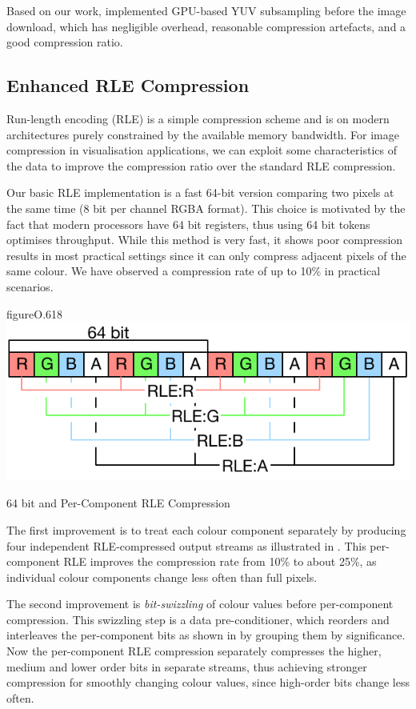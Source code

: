 Based on our work, \cite{MEP:10} implemented GPU-based YUV subsampling before
the image download, which has negligible overhead, reasonable compression
artefacts, and a good compression ratio.

\subsection{Enhanced RLE Compression}

Run-length encoding (RLE) is a simple compression scheme and is on modern
architectures purely constrained by the available memory bandwidth. For image
compression in visualisation applications, we can exploit some characteristics
of the data to improve the compression ratio over the standard RLE compression.

Our basic RLE implementation is a fast 64-bit version comparing two pixels
at the same time (8 bit per channel RGBA format). This choice is motivated by
the fact that modern processors have 64 bit registers, thus using 64 bit tokens
optimises throughput. While this method is very fast, it shows poor compression
results in most practical settings since it can only compress adjacent pixels
of the same colour. We have observed a compression rate of up to 10\% in
practical scenarios.

\begin{wrapfloat}{figure}{O}{.618\textwidth}
  \includegraphics[width=.618\textwidth]{images/RLE}
  \caption{64 bit and Per-Component RLE Compression}
  \label{fRLE}
\end{wrapfloat}

The first improvement is to treat each colour component separately by producing
four independent RLE-compressed output streams as illustrated in .
This per-component RLE improves the compression rate from 10\% to about 25\%,
as individual colour components change less often than full pixels.

The second improvement is {\em bit-swizzling} of colour values before
per-component compression. This swizzling step is a data pre-conditioner, which
reorders and interleaves the per-component bits as shown in  by
grouping them by significance. Now the per-component
RLE compression separately compresses the higher, medium and lower order bits
in separate streams, thus achieving stronger compression for smoothly changing
colour values, since high-order bits change less often.

